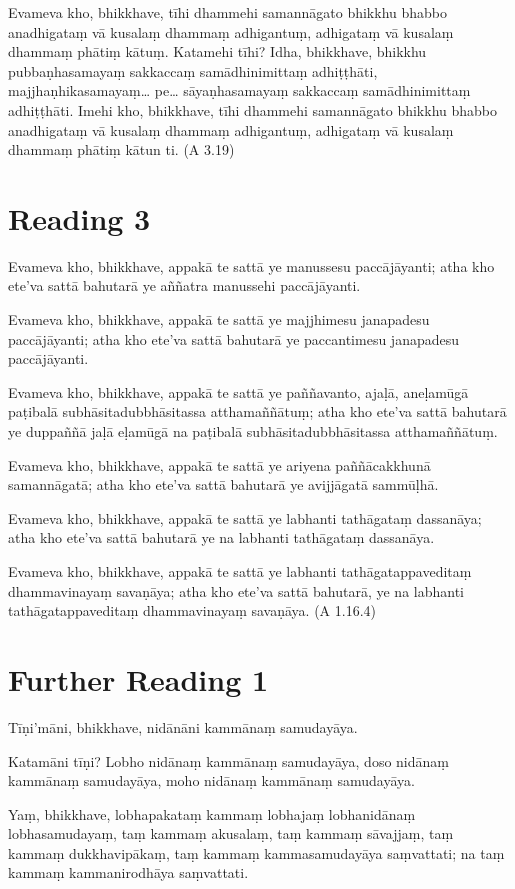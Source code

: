 Evameva kho, bhikkhave, tīhi dhammehi samannāgato bhikkhu bhabbo anadhigataṃ vā kusalaṃ dhammaṃ adhigantuṃ, adhigataṃ vā kusalaṃ dhammaṃ phātiṃ kātuṃ. Katamehi tīhi? Idha, bhikkhave, bhikkhu pubbaṇhasamayaṃ sakkaccaṃ samādhinimittaṃ adhiṭṭhāti, majjhaṇhikasamayaṃ… pe… sāyaṇhasamayaṃ sakkaccaṃ samādhinimittaṃ adhiṭṭhāti. Imehi kho, bhikkhave, tīhi dhammehi samannāgato bhikkhu bhabbo anadhigataṃ vā kusalaṃ dhammaṃ adhigantuṃ, adhigataṃ vā kusalaṃ dhammaṃ phātiṃ kātun ti. \hfill(A 3.19)

\section*{Reading 3}

Evameva kho, bhikkhave, appakā te sattā ye manussesu paccājāyanti; atha kho ete’va sattā bahutarā ye aññatra manussehi paccājāyanti.

Evameva kho, bhikkhave, appakā te sattā ye majjhimesu janapadesu paccājāyanti; atha kho ete’va sattā bahutarā ye paccantimesu janapadesu paccājāyanti.

Evameva kho, bhikkhave, appakā te sattā ye paññavanto, ajaḷā, aneḷamūgā paṭibalā subhāsitadubbhāsitassa atthamaññātuṃ; atha kho ete’va sattā bahutarā ye duppaññā jaḷā eḷamūgā na paṭibalā subhāsitadubbhāsitassa atthamaññātuṃ.

Evameva kho, bhikkhave, appakā te sattā ye ariyena paññācakkhunā samannāgatā; atha kho ete’va sattā bahutarā ye avijjāgatā sammūḷhā.

Evameva kho, bhikkhave, appakā te sattā ye labhanti tathāgataṃ dassanāya; atha kho ete’va sattā bahutarā ye na labhanti tathāgataṃ dassanāya.

Evameva kho, bhikkhave, appakā te sattā ye labhanti tathāgatappaveditaṃ dhammavinayaṃ savaṇāya; atha kho ete’va sattā bahutarā, ye na labhanti tathāgatappaveditaṃ dhammavinayaṃ savaṇāya. \hfill(A 1.16.4)

\section*{Further Reading 1}

Tīṇi’māni, bhikkhave, nidānāni kammānaṃ samudayāya.

Katamāni tīṇi? Lobho nidānaṃ kammānaṃ samudayāya, doso nidānaṃ kammānaṃ samudayāya, moho nidānaṃ kammānaṃ samudayāya.

Yaṃ, bhikkhave, lobhapakataṃ kammaṃ lobhajaṃ lobhanidānaṃ lobhasamudayaṃ, taṃ kammaṃ akusalaṃ, taṃ kammaṃ sāvajjaṃ, taṃ kammaṃ dukkhavipākaṃ, taṃ kammaṃ kammasamudayāya saṃvattati; na taṃ kammaṃ kammanirodhāya saṃvattati.

